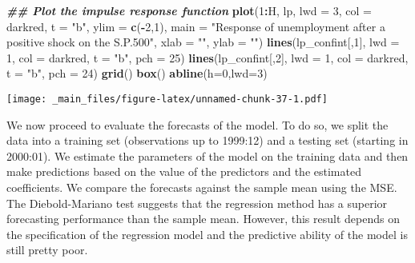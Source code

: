 \documentclass[
]{book}
\newenvironment{Shaded}{\begin{snugshade}}{\end{snugshade}}
\newcommand{\AttributeTok}[1]{\textcolor[rgb]{0.13,0.29,0.53}{#1}}
\newcommand{\DecValTok}[1]{\textcolor[rgb]{0.00,0.00,0.81}{#1}}
\newcommand{\DocumentationTok}[1]{\textcolor[rgb]{0.56,0.35,0.01}{\textbf{\textit{#1}}}}
\newcommand{\FunctionTok}[1]{\textcolor[rgb]{0.13,0.29,0.53}{\textbf{#1}}}
\newcommand{\NormalTok}[1]{#1}
\newcommand{\SpecialCharTok}[1]{\textcolor[rgb]{0.81,0.36,0.00}{\textbf{#1}}}
\newcommand{\StringTok}[1]{\textcolor[rgb]{0.31,0.60,0.02}{#1}}
\begin{document}
\begin{Shaded}
\begin{Highlighting}[]
\DocumentationTok{\#\# Plot the impulse response function}
\FunctionTok{plot}\NormalTok{(}\DecValTok{1}\SpecialCharTok{:}\NormalTok{H, lp,         }\AttributeTok{lwd =} \DecValTok{3}\NormalTok{, }\AttributeTok{col =} \StringTok{\textquotesingle{}darkred\textquotesingle{}}\NormalTok{, }\AttributeTok{t =} \StringTok{"b"}\NormalTok{, }\AttributeTok{ylim =} \FunctionTok{c}\NormalTok{(}\SpecialCharTok{{-}}\DecValTok{2}\NormalTok{,}\DecValTok{1}\NormalTok{),}
     \AttributeTok{main =} \StringTok{"Response of unemployment after a positive shock on the S.P.500"}\NormalTok{,}
     \AttributeTok{xlab =} \StringTok{""}\NormalTok{, }\AttributeTok{ylab =} \StringTok{""}\NormalTok{)}
\FunctionTok{lines}\NormalTok{(lp\_confint[,}\DecValTok{1}\NormalTok{], }\AttributeTok{lwd =} \DecValTok{1}\NormalTok{, }\AttributeTok{col =} \StringTok{\textquotesingle{}darkred\textquotesingle{}}\NormalTok{, }\AttributeTok{t =} \StringTok{"b"}\NormalTok{, }\AttributeTok{pch  =} \DecValTok{25}\NormalTok{)}
\FunctionTok{lines}\NormalTok{(lp\_confint[,}\DecValTok{2}\NormalTok{], }\AttributeTok{lwd =} \DecValTok{1}\NormalTok{, }\AttributeTok{col =} \StringTok{\textquotesingle{}darkred\textquotesingle{}}\NormalTok{, }\AttributeTok{t =} \StringTok{"b"}\NormalTok{, }\AttributeTok{pch  =} \DecValTok{24}\NormalTok{)}
\FunctionTok{grid}\NormalTok{()}
\FunctionTok{box}\NormalTok{()}
\FunctionTok{abline}\NormalTok{(}\AttributeTok{h=}\DecValTok{0}\NormalTok{,}\AttributeTok{lwd=}\DecValTok{3}\NormalTok{)}
\end{Highlighting}
\end{Shaded}

\texttt{[image: \_main\_files/figure-latex/unnamed-chunk-37-1.pdf]}

We now proceed to evaluate the forecasts of the model. To do so, we split the data into a training set (observations up to 1999:12) and a testing set (starting in 2000:01). We estimate the parameters of the model on the training data and then make predictions based on the value of the predictors and the estimated coefficients. We compare the forecasts against the sample mean using the MSE. The Diebold-Mariano test suggests that the regression method has a superior forecasting performance than the sample mean. However, this result depends on the specification of the regression model and the predictive ability of the model is still pretty poor.
\end{document}
